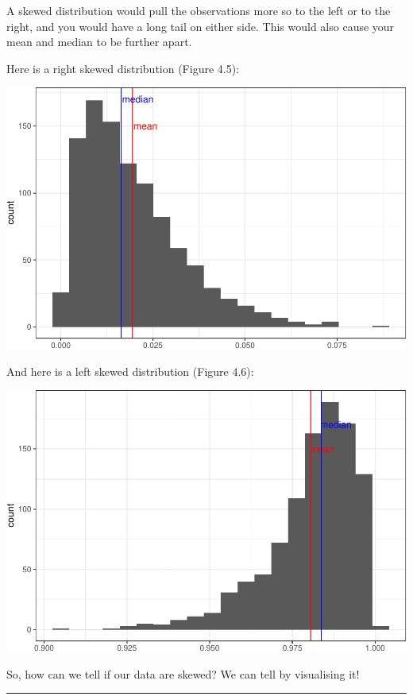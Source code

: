 \documentclass[
]{book}
\begin{document}
A skewed distribution would pull the observations more so to the left or to the right, and you would have a long tail on either side. This would also cause your mean and median to be further apart.

Here is a right skewed distribution (Figure 4.5):

\includegraphics{04-descriptive-statistics_files/figure-latex/unnamed-chunk-43-1.pdf}

And here is a left skewed distribution (Figure 4.6):

\includegraphics{04-descriptive-statistics_files/figure-latex/unnamed-chunk-44-1.pdf}

So, how can we tell if our data are skewed? We can tell by visualising it!

\begin{center}\rule{0.5\linewidth}{0.5pt}\end{center}
\end{document}
